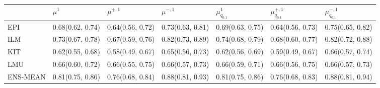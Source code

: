 \begin{tabular}{l p{} p{} p{} p{} p{} p{}}
\toprule
 & $\mu^{1}$ & $\mu^{+, 1}$ & $\mu^{-, 1}$ & $\mu^{1}_{q_{0.1}}$ & $\mu^{+, 1}_{q_{0.1}}$ & $\mu^{-, 1}_{q_{0.1}}$ \\
\midrule
EPI & {0.68\newline(0.62, 0.74)} & {0.64\newline(0.56, 0.72)} & {0.73\newline(0.63, 0.81)} & {0.69\newline(0.63, 0.75)} & {0.64\newline(0.56, 0.73)} & {0.75\newline(0.65, 0.82)} \\
ILM & {0.73\newline(0.67, 0.78)} & {0.67\newline(0.59, 0.76)} & {0.82\newline(0.73, 0.89)} & {0.74\newline(0.68, 0.79)} & {0.68\newline(0.60, 0.77)} & {0.82\newline(0.72, 0.88)} \\
KIT & {0.62\newline(0.55, 0.68)} & {0.58\newline(0.49, 0.67)} & {0.65\newline(0.56, 0.73)} & {0.62\newline(0.56, 0.69)} & {0.59\newline(0.49, 0.67)} & {0.66\newline(0.57, 0.74)} \\
LMU & {0.66\newline(0.60, 0.72)} & {0.66\newline(0.55, 0.75)} & {0.66\newline(0.57, 0.73)} & {0.66\newline(0.59, 0.71)} & {0.66\newline(0.56, 0.75)} & {0.66\newline(0.57, 0.73)} \\
ENS-MEAN & {0.81\newline(0.75, 0.86)} & {0.76\newline(0.68, 0.84)} & {0.88\newline(0.81, 0.93)} & {0.81\newline(0.75, 0.86)} & {0.76\newline(0.68, 0.83)} & {0.88\newline(0.81, 0.94)} \\

\end{tabular}
